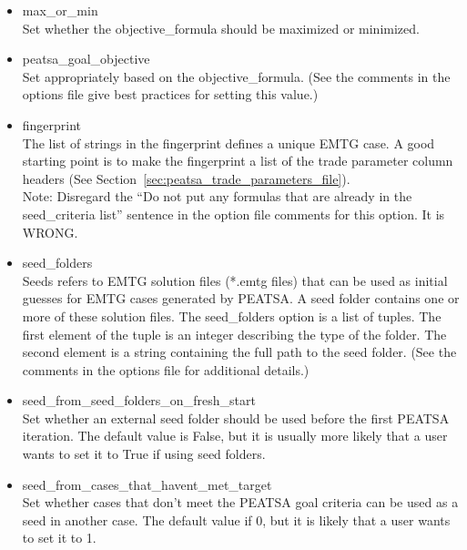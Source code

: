 \begin{itemize}
	\item max\_or\_min \\ Set whether the objective\_formula should be maximized or minimized.
	\item peatsa\_goal\_objective \\ Set appropriately based on the objective\_formula. (See the comments in the options file give best practices for setting this value.)
	\item fingerprint \\ The list of strings in the fingerprint defines a unique \ac{EMTG} case. A good starting point is to make the fingerprint a list of the trade parameter column headers (See Section~\ref{sec:peatsa_trade_parameters_file}). \\ Note: Disregard the ``Do not put any formulas that are already in the seed\_criteria list'' sentence in the option file comments for this option. It is WRONG.
	\item seed\_folders \\ Seeds refers to \ac{EMTG} solution files (*.emtg files) that can be used as initial guesses for \ac{EMTG} cases generated by \ac{PEATSA}. A seed folder contains one or more of these solution files. The seed\_folders option is a list of tuples. The first element of the tuple is an integer describing the type of the folder.  The second element is a string containing the full path to the seed folder. (See the comments in the options file for additional details.)
	\item seed\_from\_seed\_folders\_on\_fresh\_start \\ Set whether an external seed folder should be used before the first \ac{PEATSA} iteration. The default value is False, but it is usually more likely that a user wants to set it to True if using seed folders.
	\item seed\_from\_cases\_that\_havent\_met\_target \\ Set whether cases that don't meet the \ac{PEATSA} goal criteria can be used as a seed in another case. The default value if 0, but it is likely that a user wants to set it to 1.

\end{itemize}
